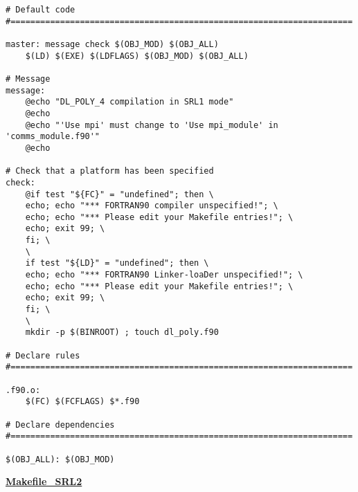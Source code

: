 \begin{verbatim}
# Default code
#=====================================================================

master: message check $(OBJ_MOD) $(OBJ_ALL)
	$(LD) $(EXE) $(LDFLAGS) $(OBJ_MOD) $(OBJ_ALL)

# Message
message:
	@echo "DL_POLY_4 compilation in SRL1 mode"
	@echo
	@echo "'Use mpi' must change to 'Use mpi_module' in 'comms_module.f90'"
	@echo

# Check that a platform has been specified
check:
	@if test "${FC}" = "undefined"; then \
	echo; echo "*** FORTRAN90 compiler unspecified!"; \
	echo; echo "*** Please edit your Makefile entries!"; \
	echo; exit 99; \
	fi; \
	\
	if test "${LD}" = "undefined"; then \
	echo; echo "*** FORTRAN90 Linker-loaDer unspecified!"; \
	echo; echo "*** Please edit your Makefile entries!"; \
	echo; exit 99; \
	fi; \
	\
	mkdir -p $(BINROOT) ; touch dl_poly.f90

# Declare rules
#=====================================================================

.f90.o:
	$(FC) $(FCFLAGS) $*.f90

# Declare dependencies
#=====================================================================

$(OBJ_ALL): $(OBJ_MOD)
\end{verbatim}
\clearpage
{\sc \bf \underline{Makefile\_SRL2}}

